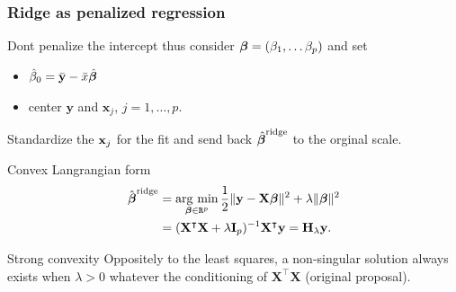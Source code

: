 \documentclass[10pt, c, xcolor=x11names]{beamer}\usepackage[]{graphicx}\usepackage[]{color}
\begin{document}
\begin{frame}
  \frametitle{Ridge as penalized regression}

  \alert{Dont  penalize   the  intercept}  thus  consider   $\boldsymbol\beta  =
  (\beta_1,\dots\beta_p)$ and set
  \begin{itemize}
  \item $\hat{\beta}_0 = \bar{\mathbf{y}} - \bar{x}\,\hat{\!\boldsymbol\beta}$
  \item center $\mathbf{y}$ and $\mathbf{x}_j$, $j=1,\dots,p$.
  \end{itemize}
  \alert{Standardize the $\mathbf{x}_j$} for the fit and send back
  $\,\hat{\!\boldsymbol\beta}^{\mathrm{ridge}}$ to the \alert{orginal scale}.

  \vfill

  \begin{block}{Convex Langrangian form}
    \vspace{-.5cm}
    \begin{align*}
      \hat{\boldsymbol\beta}^{\text{ridge}} &  =   \mathop{\mathrm{arg\ min}}_{\boldsymbol\beta\in\texttt{R}^p}  \frac{1}{2}
      \|\mathbf{y} - \mathbf{X} \boldsymbol\beta\|^2 + \lambda \|\boldsymbol\beta\|^2\\
      & = (\mathbf{X}^\intercal \mathbf{X} +
      \lambda \mathbf{I}_p)^{-1} \mathbf{X}^\intercal \mathbf{y} = \mathbf{H}_\lambda \mathbf{y}.
    \end{align*}
  \end{block}

  \vfill

  \begin{block}{Strong convexity}
    Oppositely to  the least squares, a  non-singular solution always
    exists   when    $\lambda>0$   whatever   the    conditioning   of
    $\mathbf{X}^\intercal \mathbf{X}$ (original proposal).
  \end{block}

\end{frame}



\end{document}

